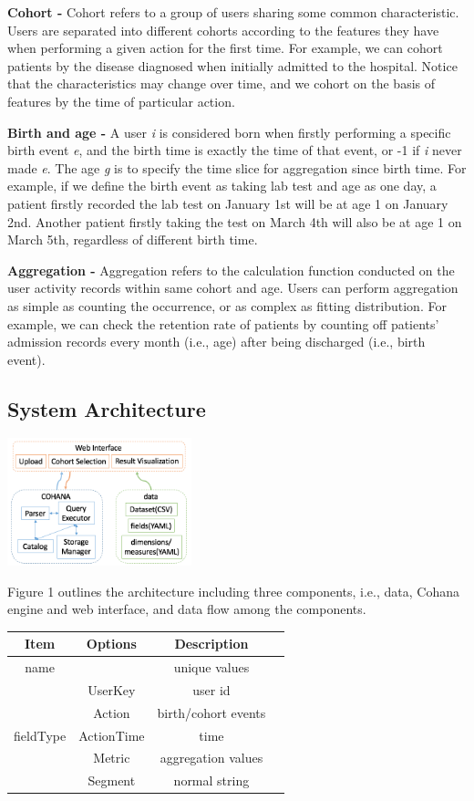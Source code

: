 \documentclass[10pt,conference,letterpaper]{IEEEtran}
\begin{document}
\textbf{Cohort -} Cohort refers to a group of users sharing some common characteristic. Users are separated into different cohorts according to the features they have when performing a given action for the first time. For example, we can cohort patients by the disease diagnosed when initially admitted to the hospital. Notice that the characteristics may change over time, and we cohort on the basis of features by the time of particular action.

\textbf{Birth and age -} A user \emph{i} is considered born when firstly performing a specific birth event \emph{e}, and the birth time is exactly the time of that event, or -1 if \emph{i} never made \emph{e}. The age \emph{g} is to specify the time slice for aggregation since birth time. For example, if we define the birth event as taking lab test and age as one day, a patient firstly recorded the lab test on January 1st will be at age 1 on January 2nd. Another patient firstly taking the test on March 4th will also be at age 1 on March 5th, regardless of different birth time.

\textbf{Aggregation -} Aggregation refers to the calculation function conducted on the user activity records within same cohort and age. Users can perform aggregation as simple as counting the occurrence, or as complex as fitting distribution. For example, we can check the retention rate of patients by counting off patients' admission records every month (i.e., age) after being discharged (i.e., birth event).

\subsection{System Architecture}

\includegraphics[width=0.4\textwidth]{arch.png}

Figure 1 outlines the architecture including three components, i.e., data, Cohana engine and web interface, and data flow among the components.

\begin{center}
\begin{tabular}{ |c|c|c|c| }
\hline
Item & Options & Description \\
\hline
name & & unique values \\
\hline
\multirow{5}{*}{fieldType} & UserKey & user id \\\cline{2-3}
& Action & birth/cohort events \\\cline{2-3}
& ActionTime & time \\\cline{2-3}
& Metric & aggregation values \\\cline{2-3}
& Segment & normal string \\
\hline
\end{tabular}
\end{center}
\end{document}
